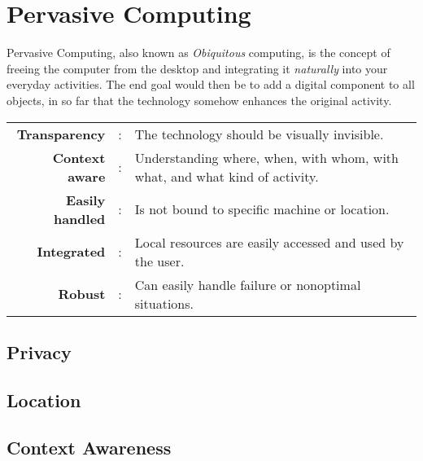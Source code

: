 \section{Pervasive Computing} \label{sec:pervasive_computing}  
Pervasive Computing, also known as \emph{Obiquitous} computing, is the concept of freeing the computer from the desktop and integrating it \emph{naturally} into your everyday activities. The end goal would then be to add a digital component to all objects, in so far that the technology somehow enhances the original activity.

\begin{longtable}{rc>{\raggedright\arraybackslash}p{}}
  \textbf{Transparency} & : &
  The technology should be visually invisible.
  \\ \textbf{Context aware} & : &
  Understanding where, when, with whom, with what, and what kind of activity.
  \\ \textbf{Easily handled} & : &
  Is not bound to specific machine or location.
  \\ \textbf{Integrated} & : &
  Local resources are easily accessed and used by the user.
  \\ \textbf{Robust} & : &
  Can easily handle failure or nonoptimal situations.
\end{longtable}



\subsection{Privacy}


\subsection{Location}


\subsection{Context Awareness}




